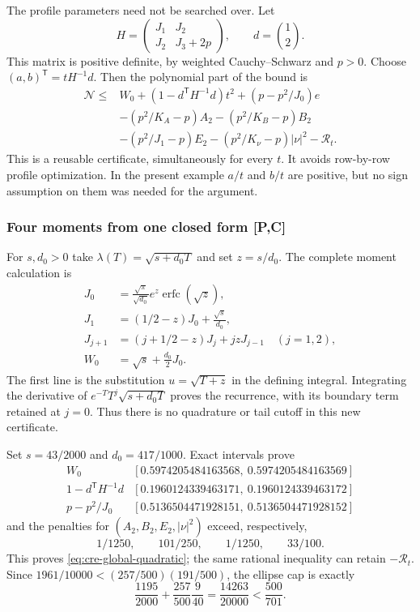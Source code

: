 The profile parameters need not be searched over. Let
\[
 H=\begin{pmatrix}J_1&J_2\\J_2&J_3+2p\end{pmatrix},\qquad d=\binom12.
\]
This matrix is positive definite, by weighted Cauchy--Schwarz and $p>0$.
Choose $(a,b)^{\mathsf T}=tH^{-1}d$. Then the polynomial part of the bound is
\begin{equation}\label{eq:cre-master}
\boxed{\begin{aligned}
 \mathcal N\le{}&W_0+(1-d^{\mathsf T}H^{-1}d)t^2+(p-p^2/J_0)e\\
 &-(p^2/K_A-p)A_2-(p^2/K_B-p)B_2\\
 &-(p^2/J_1-p)E_2-(p^2/K_\nu-p)|\nu|^2-\mathcal R_t.
\end{aligned}}
\end{equation}
This is a reusable certificate, simultaneously for every $t$. It avoids
row-by-row profile optimization. In the present example $a/t$ and $b/t$
are positive, but no sign assumption on them was needed for the argument.

\subsubsection{Four moments from one closed form [P,C]}
For $s,d_0>0$ take $\lambda(T)=\sqrt{s+d_0T}$ and set $z=s/d_0$.
The complete moment calculation is
\begin{align*}
 J_0&=\frac{\sqrt\pi}{\sqrt{d_0}}e^z\operatorname{erfc}(\sqrt z),\\
 J_1&=(1/2-z)J_0+\frac{\sqrt s}{d_0},\\
 J_{j+1}&=(j+1/2-z)J_j+jzJ_{j-1}\quad(j=1,2),\\
 W_0&=\sqrt s+\frac{d_0}2J_0.
\end{align*}
The first line is the substitution $u=\sqrt{T+z}$ in the defining
integral. Integrating the derivative of
$e^{-T}T^j\sqrt{s+d_0T}$ proves the recurrence, with its boundary term
retained at $j=0$. Thus there is no quadrature or tail cutoff in this new
certificate.

Set $s=43/2000$ and $d_0=417/1000$. Exact intervals prove
\[
\begin{array}{c|c}
 W_0&[0.5974205484163568,\ 0.5974205484163569]\\
 1-d^{\mathsf T}H^{-1}d&[0.1960124339463171,\ 0.1960124339463172]\\
 p-p^2/J_0&[0.5136504471928151,\ 0.5136504471928152]
\end{array}
\]
and the penalties for $(A_2,B_2,E_2,|\nu|^2)$ exceed, respectively,
\[
 1/1250,\qquad101/250,\qquad1/1250,\qquad33/100.
\]
This proves \eqref{eq:cre-global-quadratic}; the same rational inequality
can retain $-\mathcal R_t$. Since
$1961/10000<(257/500)(191/500)$, the ellipse cap is exactly
\[
 \frac{1195}{2000}+\frac{257}{500}\frac9{40}
       =\frac{14263}{20000}<\frac{500}{701}.
\]

